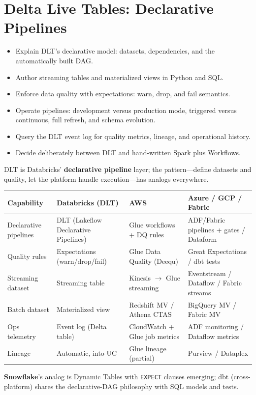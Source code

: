 \chapter{Delta Live Tables: Declarative Pipelines}
%
%
\begin{objectives}
\begin{itemize}
    \item Explain DLT's declarative model: datasets, dependencies, and the automatically built DAG.
    \item Author streaming tables and materialized views in Python and SQL.
    \item Enforce data quality with expectations: warn, drop, and fail semantics.
    \item Operate pipelines: development versus production mode, triggered versus continuous, full refresh, and schema evolution.
    \item Query the DLT event log for quality metrics, lineage, and operational history.
    \item Decide deliberately between DLT and hand-written Spark plus Workflows.
\end{itemize}
\end{objectives}

\begin{crosscloud}
DLT is Databricks' \textbf{declarative pipeline} layer; the pattern---define datasets and quality,
let the platform handle execution---has analogs everywhere.

\vspace{2mm}
{\footnotesize
\begin{tabular}{@{}p{3.0cm}p{3.4cm}p{3.2cm}p{3.2cm}@{}}
\toprule
\textbf{Capability} & \textbf{Databricks (DLT)} & \textbf{AWS} & \textbf{Azure / GCP / Fabric} \\
\midrule
Declarative pipelines & DLT (Lakeflow Declarative Pipelines) & Glue workflows + DQ rules & ADF/Fabric pipelines + gates / Dataform \\
Quality rules & Expectations (warn/drop/fail) & Glue Data Quality (Deequ) & Great Expectations / dbt tests \\
Streaming dataset & Streaming table & Kinesis $\rightarrow$ Glue streaming & Eventstream / Dataflow / Fabric streams \\
Batch dataset & Materialized view & Redshift MV / Athena CTAS & BigQuery MV / Fabric MV \\
Ops telemetry & Event log (Delta table) & CloudWatch + Glue job metrics & ADF monitoring / Dataflow metrics \\
Lineage & Automatic, into UC & Glue lineage (partial) & Purview / Dataplex \\
\bottomrule
\end{tabular}}

\vspace{1mm}
\textbf{Snowflake}'s analog is Dynamic Tables with \texttt{EXPECT} clauses emerging; dbt
(cross-platform) shares the declarative-DAG philosophy with SQL models and tests.
\end{crosscloud}

